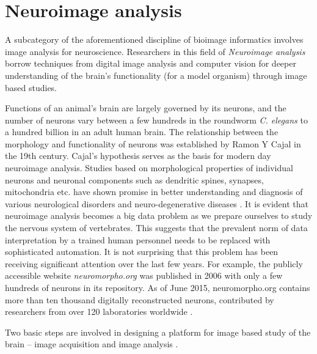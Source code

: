 \section{Neuroimage analysis}
A subcategory of the aforementioned  discipline of bioimage informatics involves image analysis for neuroscience. Researchers in this field of \textit{Neuroimage analysis}  borrow techniques from digital image analysis and computer vision for deeper understanding of the brain's functionality (for a model organism) through image based studies.

Functions of an animal's brain are largely governed by its neurons, and the number of neurons vary between a few hundreds in the roundworm \textit{C. elegans}\cite{cElegans} to a hundred billion in an adult human brain. The relationship between the morphology and functionality of neurons was established by Ramon Y Cajal in the 19th century. Cajal’s hypothesis serves as the basis for modern day neuroimage analysis. Studies based on morphological properties of individual neurons and neuronal components such as dendritic spines, synapses, mitochondria etc. have shown promise in better understanding and diagnosis of various neurological disorders and neuro-degenerative diseases \cite{bio_belichenko1994rett,neuron_structure,barry_serotonergic,barry_branching,cuntz_neuron}. It is evident that neuroimage analysis becomes a big data problem as we prepare ourselves to study the nervous system of vertebrates. This suggests that the prevalent norm of data interpretation by a trained human personnel needs to be replaced with sophisticated automation. It is not surprising that this problem has been receiving significant attention over the last few years. For example, the publicly accessible website \textit{neuromorpho.org} \cite{neuromorpho} was published in 2006 with only a few hundreds of neurons in its repository. As of June 2015, neuromorpho.org contains more than ten thousand digitally reconstructed neurons, contributed by researchers from over 120 laboratories worldwide \cite{nanda2015doubling}.


Two basic steps are involved in designing a platform for image based study of the brain -- image acquisition and image analysis \cite{meijering_survey}. 

